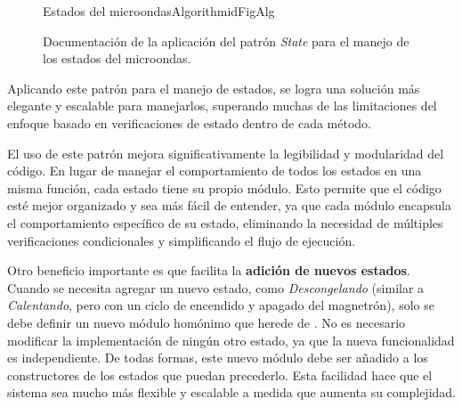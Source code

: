 \begin{figure}
\caption{Documentación de la aplicación del patrón \textit{State} para el manejo de los estados del microondas.}
\label{docState}
\begin{pattern}[]{Estados del microondas}{Algorithm}{idFigAlg}
\assigns
{}

\end{pattern}
\end{figure}


Aplicando este patrón para el manejo de estados, se logra una solución más elegante y escalable para manejarlos, superando muchas de las limitaciones del enfoque basado en verificaciones de estado dentro de cada método.


El uso de este patrón mejora significativamente la legibilidad y modularidad del código. En lugar de manejar el comportamiento de todos los estados en una misma función, cada estado tiene su propio módulo. Esto permite que el código esté mejor organizado y sea más fácil de entender, ya que cada módulo encapsula el comportamiento específico de su estado, eliminando la necesidad de múltiples verificaciones condicionales y simplificando el flujo de ejecución.

Otro beneficio importante es que facilita la \textbf{adición de nuevos estados}. Cuando se necesita agregar un nuevo estado, como \textit{Descongelando} (similar a \textit{Calentando}, pero con un ciclo de encendido y apagado del magnetrón), solo se debe definir un nuevo módulo homónimo que herede de \EstadoMicroondas. No es necesario modificar la implementación de ningún otro estado, ya que la nueva funcionalidad es independiente. De todas formas, este nuevo módulo debe ser añadido a los constructores de los estados que puedan precederlo. Esta facilidad hace que el sistema sea mucho más flexible y escalable a medida que aumenta su complejidad.

